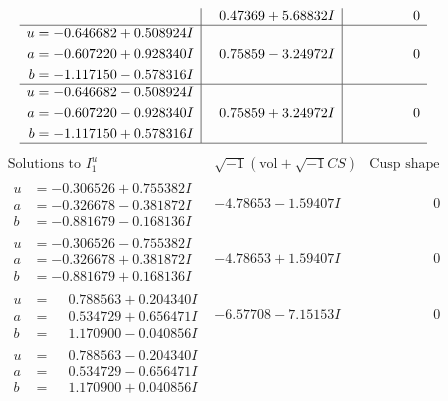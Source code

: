 \documentclass[1p]{elsarticle_modified}
\theoremstyle{definition}
\newcommand{\I}{\sqrt{-1}}
\begin{document}
$$\begin{array}{c|c|c}
 & \phantom{-}0.47369 + 5.68832 I & \phantom{-0.000000 } 0 \\ \hline\begin{aligned}
u &= -0.646682 + 0.508924 I \\
a &= -0.607220 + 0.928340 I \\
b &= -1.117150 - 0.578316 I\end{aligned}
 & \phantom{-}0.75859 - 3.24972 I & \phantom{-0.000000 } 0 \\ \hline\begin{aligned}
u &= -0.646682 - 0.508924 I \\
a &= -0.607220 - 0.928340 I \\
b &= -1.117150 + 0.578316 I\end{aligned}
 & \phantom{-}0.75859 + 3.24972 I & \phantom{-0.000000 } 0\\
 \hline 
 \end{array}$$\newpage$$\begin{array}{c|c|c}  
\text{Solutions to }I^u_{1}& \I (\text{vol} + \sqrt{-1}CS) & \text{Cusp shape}\\
 \hline 
\begin{aligned}
u &= -0.306526 + 0.755382 I \\
a &= -0.326678 - 0.381872 I \\
b &= -0.881679 - 0.168136 I\end{aligned}
 & -4.78653 - 1.59407 I & \phantom{-0.000000 } 0 \\ \hline\begin{aligned}
u &= -0.306526 - 0.755382 I \\
a &= -0.326678 + 0.381872 I \\
b &= -0.881679 + 0.168136 I\end{aligned}
 & -4.78653 + 1.59407 I & \phantom{-0.000000 } 0 \\ \hline\begin{aligned}
u &= \phantom{-}0.788563 + 0.204340 I \\
a &= \phantom{-}0.534729 + 0.656471 I \\
b &= \phantom{-}1.170900 - 0.040856 I\end{aligned}
 & -6.57708 - 7.15153 I & \phantom{-0.000000 } 0 \\ \hline\begin{aligned}
u &= \phantom{-}0.788563 - 0.204340 I \\
a &= \phantom{-}0.534729 - 0.656471 I \\
b &= \phantom{-}1.170900 + 0.040856 I\end{aligned}

\end{array}$$
\end{document}
